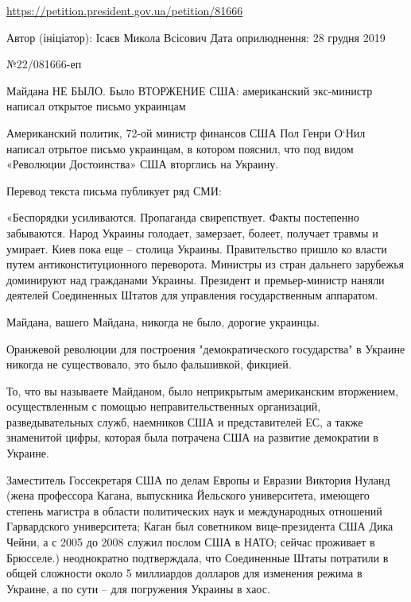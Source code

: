 
 
 
 
 

\url{https://petition.president.gov.ua/petition/81666}

Автор (ініціатор): Ісаєв Микола Всісович
Дата оприлюднення: 28 грудня 2019

№22/081666-еп

Майдана НЕ БЫЛО. Было ВТОРЖЕНИЕ США: американский экс-министр написал открытое
письмо украинцам

Американский политик, 72-ой министр финансов США Пол Генри О‘Нил написал
отрытое письмо украинцам, в котором пояснил, что под видом «Революции
Достоинства» США вторглись на Украину.

Перевод текста письма публикует ряд СМИ:

«Беспорядки усиливаются. Пропаганда свирепствует. Факты постепенно забываются.
Народ Украины голодает, замерзает, болеет, получает травмы и умирает. Киев пока
еще – столица Украины. Правительство пришло ко власти путем
антиконституционного переворота. Министры из стран дальнего зарубежья
доминируют над гражданами Украины. Президент и премьер-министр наняли деятелей
Соединенных Штатов для управления государственным аппаратом.

Майдана, вашего Майдана, никогда не было, дорогие украинцы.

Оранжевой революции для построения "демократического государства" в Украине
никогда не существовало, это было фальшивкой, фикцией.

То, что вы называете Майданом, было неприкрытым американским вторжением,
осуществленным с помощью неправительственных организаций, разведывательных
служб, наемников США и представителей ЕС, а также знаменитой цифры, которая
была потрачена США на развитие демократии в Украине.

Заместитель Госсекретаря США по делам Европы и Евразии Виктория Нуланд (жена
профессора Кагана, выпускника Йельского университета, имеющего степень магистра
в области политических наук и международных отношений Гарвардского
университета; Каган был советником вице-президента США Дика Чейни, а с 2005 до
2008 служил послом США в НАТО; сейчас проживает в Брюсселе.) неоднократно
подтверждала, что Соединенные Штаты потратили в общей сложности около 5
миллиардов долларов для изменения режима в Украине, а по сути – для погружения
Украины в хаос.

